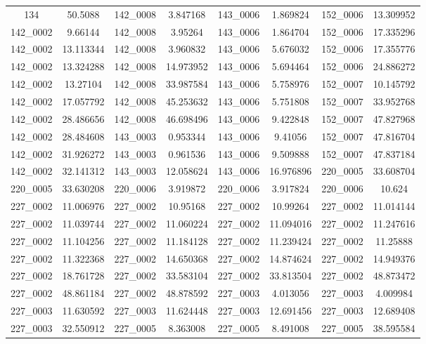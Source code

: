 \begin{table}[H]
\begin{tabular}{|c|c|c|c|c|c|c|c|}
        134 & 50.5088 & 142\_0008 & 3.847168 & 143\_0006 & 1.869824 & 152\_0006 & 13.309952 \\
        142\_0002 & 9.66144 & 142\_0008 & 3.95264 & 143\_0006 & 1.864704 & 152\_0006 & 17.335296 \\
        142\_0002 & 13.113344 & 142\_0008 & 3.960832 & 143\_0006 & 5.676032 & 152\_0006 & 17.355776 \\
        142\_0002 & 13.324288 & 142\_0008 & 14.973952 & 143\_0006 & 5.694464 & 152\_0006 & 24.886272 \\
        142\_0002 & 13.27104 & 142\_0008 & 33.987584 & 143\_0006 & 5.758976 & 152\_0007 & 10.145792 \\
        142\_0002 & 17.057792 & 142\_0008 & 45.253632 & 143\_0006 & 5.751808 & 152\_0007 & 33.952768 \\
        142\_0002 & 28.486656 & 142\_0008 & 46.698496 & 143\_0006 & 9.422848 & 152\_0007 & 47.827968 \\
        142\_0002 & 28.484608 & 143\_0003 & 0.953344 & 143\_0006 & 9.41056 & 152\_0007 & 47.816704 \\
        142\_0002 & 31.926272 & 143\_0003 & 0.961536 & 143\_0006 & 9.509888 & 152\_0007 & 47.837184 \\
        142\_0002 & 32.141312 & 143\_0003 & 12.058624 & 143\_0006 & 16.976896 & 220\_0005 & 33.608704 \\
        220\_0005 & 33.630208 & 220\_0006 & 3.919872 & 220\_0006 & 3.917824 & 220\_0006 & 10.624 \\
        227\_0002 & 11.006976 & 227\_0002 & 10.95168 & 227\_0002 & 10.99264 & 227\_0002 & 11.014144 \\
        227\_0002 & 11.039744 & 227\_0002 & 11.060224 & 227\_0002 & 11.094016 & 227\_0002 & 11.247616 \\
        227\_0002 & 11.104256 & 227\_0002 & 11.184128 & 227\_0002 & 11.239424 & 227\_0002 & 11.25888 \\
        227\_0002 & 11.322368 & 227\_0002 & 14.650368 & 227\_0002 & 14.874624 & 227\_0002 & 14.949376 \\
        227\_0002 & 18.761728 & 227\_0002 & 33.583104 & 227\_0002 & 33.813504 & 227\_0002 & 48.873472 \\
        227\_0002 & 48.861184 & 227\_0002 & 48.878592 & 227\_0003 & 4.013056 & 227\_0003 & 4.009984 \\
        227\_0003 & 11.630592 & 227\_0003 & 11.624448 & 227\_0003 & 12.691456 & 227\_0003 & 12.689408 \\
        227\_0003 & 32.550912 & 227\_0005 & 8.363008 & 227\_0005 & 8.491008 & 227\_0005 & 38.595584 \\

\end{tabular}
\end{table}
